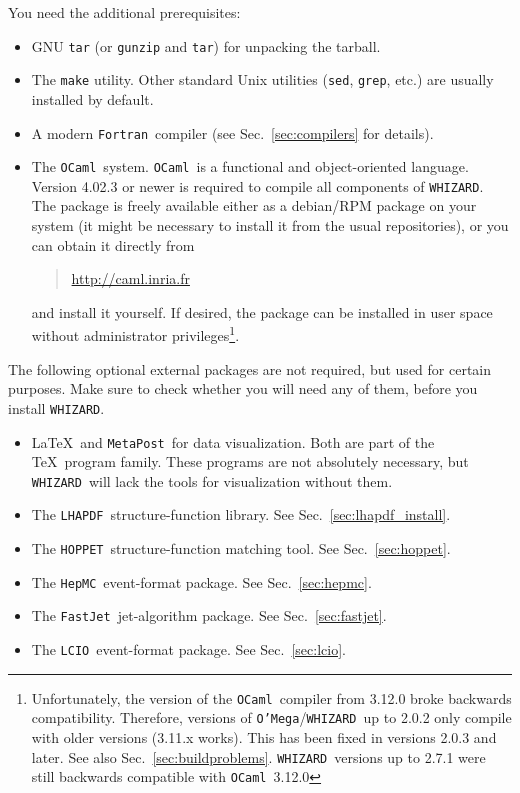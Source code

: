 \documentclass[12pt]{book}
\newcommand{\ttt}[1]{\texttt{#1}}
\newcommand{\whizard}{\ttt{WHIZARD}}
\newcommand{\oMega}{\ttt{O'Mega}}
\newcommand{\lcio}{\ttt{LCIO}}
\newcommand{\lhapdf}{\ttt{LHAPDF}}
\newcommand{\hepmc}{\ttt{HepMC}}
\newcommand{\fastjet}{\ttt{FastJet}}
\newcommand{\hoppet}{\ttt{HOPPET}}
\newcommand{\metapost}{\ttt{MetaPost}}
\newcommand{\fortran}{\ttt{Fortran}}
\newcommand{\ocaml}{\ttt{OCaml}}
\begin{document}
You need the additional prerequisites:
\begin{itemize}
\item
  GNU \ttt{tar} (or \ttt{gunzip} and \ttt{tar}) for unpacking the
  tarball.
\item
  The \ttt{make} utility.  Other standard Unix utilities (\ttt{sed},
  \ttt{grep}, etc.) are usually installed by default.
\item
  A modern \fortran\ compiler (see Sec.~\ref{sec:compilers} for
  details).
\item
  The \ocaml\ system.  \ocaml\ is a functional and object-oriented
  language.  Version 4.02.3 or newer is required to compile all
  components of \whizard. The package is freely available either as a
  debian/RPM package on your system (it might be necessary to install
  it from the usual repositories), or you can obtain it directly from
  \begin{quote}
    \url{http://caml.inria.fr}
  \end{quote}
  and install it yourself.  If desired, the package can be installed
  in user space without administrator privileges\footnote{
    Unfortunately, the version of the \ocaml\
    compiler from 3.12.0 broke backwards compatibility. Therefore,
    versions of \oMega/\whizard\ up to 2.0.2 only compile with older
    versions (3.11.x works). This has been fixed in versions
    2.0.3 and later. See also
    Sec.~\ref{sec:buildproblems}. \whizard\ versions up to 2.7.1 were
    still backwards compatible with \ocaml\ 3.12.0}.
\end{itemize}
The following optional external packages are not required, but used
for certain purposes.  Make sure to check whether you will need any of
them, before you install \whizard.
\begin{itemize}
\item
  \LaTeX\ and \metapost\ for data visualization.  Both are part of the
  \TeX\ program family.  These programs are not absolutely necessary,
  but \whizard\ will lack the tools for visualization without them.
\item
  The \lhapdf\ structure-function library.  See
  Sec.~\ref{sec:lhapdf_install}.
\item
  The \hoppet\ structure-function matching tool. See
  Sec.~\ref{sec:hoppet}.
\item
  The \hepmc\ event-format package.  See Sec.~\ref{sec:hepmc}.
\item
  The \fastjet\ jet-algorithm package.  See Sec.~\ref{sec:fastjet}.
\item
  The \lcio\ event-format package.  See Sec.~\ref{sec:lcio}.
\end{itemize}
\end{document}

